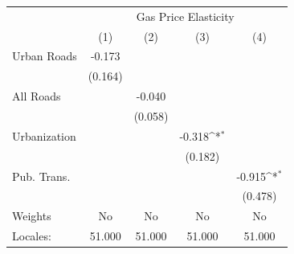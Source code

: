 {
\def\sym#1{\ifmmode^{#1}\else\(^{#1}\)\fi}
\begin{tabular}{l*{4}{c}}
\hline\hline
            &\multicolumn{4}{c}{Gas Price Elasticity}                                               \\
            &\multicolumn{1}{c}{(1)}         &\multicolumn{1}{c}{(2)}         &\multicolumn{1}{c}{(3)}         &\multicolumn{1}{c}{(4)}         \\
\hline
Urban Roads &      -0.173         &                     &                     &                     \\
            &     (0.164)         &                     &                     &                     \\
[1em]
All Roads   &                     &      -0.040         &                     &                     \\
            &                     &     (0.058)         &                     &                     \\
[1em]
Urbanization&                     &                     &      -0.318\sym{*}  &                     \\
            &                     &                     &     (0.182)         &                     \\
[1em]
Pub. Trans. &                     &                     &                     &      -0.915\sym{*}  \\
            &                     &                     &                     &     (0.478)         \\
\hline
Weights     &          No         &          No         &          No         &          No         \\
Locales:    &      51.000         &      51.000         &      51.000         &      51.000         \\
\hline\hline
\end{tabular}
}
